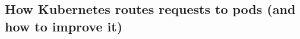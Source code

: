 \documentclass[letterpaper,twocolumn,10pt]{article}
\let\origref\ref
\def\ref#1{\textbf{\origref{#1}}}
\begin{document}
%
% 


\subsection{How Kubernetes routes requests to pods (and how to improve
  it)}
\end{document}

